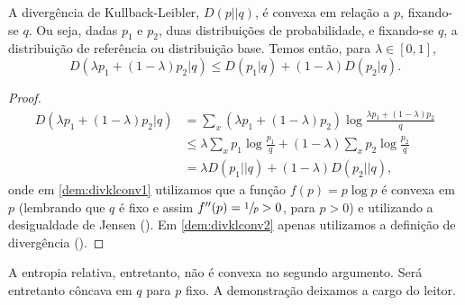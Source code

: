 \begin{theorem}\label{thm:divklconvp}
A divergência de Kullback-Leibler, $D(p||q)$, é convexa em relação a $p$, fixando-se $q$.
Ou seja, dadas $p_1$ e $p_2$, duas distribuições de probabilidade, e fixando-se $q$,
a distribuição de referência ou distribuição base. Temos então, para $\lambda \in [0,1]$,
\begin{equation}
D(\lambda p_1+(1-\lambda)p_2|q) \leq D(p_1|q) + (1-\lambda)D(p_2|q) .
\end{equation}
\end{theorem}
\begin{proof}
\begin{subequations}\label{dem:divklconv}
\begin{align}
D(\lambda p_1+(1-\lambda)p_2|q) &= \sum_x \left(\lambda p_1+(1-\lambda)p_2\right)\log\frac{\lambda p_1+(1-\lambda)p_2}{q} \label{dem:divklconv1}\\
				&\leq \lambda \sum_x p_1 \log \frac{p_1}{q} + (1-\lambda) \sum_x p_2 \log \frac{p_2}{q} \label{dem:divklconv2}\\
				&= \lambda D(p_1||q) + (1-\lambda) D(p_2||q) ,\label{dem:divklconv3}
\end{align}
\end{subequations}
onde em \ref{dem:divklconv1} utilizamos que a função $f(p) = p \log p$ é convexa em $p$ 
(lembrando que $q$ é fixo e assim $f''(p) = \sfrac{1}{p} > 0$, para $p>0$) e utilizando
a desigualdade de Jensen (). Em \ref{dem:divklconv2} apenas utilizamos a
definição de divergência ().
\end{proof}
A entropia relativa, entretanto, não é convexa no segundo argumento. Será entretanto
côncava em $q$ para $p$ fixo. A demonstração deixamos a cargo do leitor.

